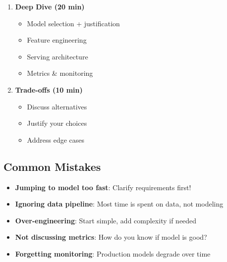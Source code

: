 \documentclass[8pt,landscape]{article}
\begin{document}
\begin{multicols}{3}
\begin{enumerate}
\item \textbf{Deep Dive (20 min)}
\begin{itemize}
\item Model selection + justification
\item Feature engineering
\item Serving architecture
\item Metrics \& monitoring
\end{itemize}

\item \textbf{Trade-offs (10 min)}
\begin{itemize}
\item Discuss alternatives
\item Justify your choices
\item Address edge cases
\end{itemize}
\end{enumerate}

\subsection*{Common Mistakes}

\begin{itemize}
\item \textbf{Jumping to model too fast}: Clarify requirements first!
\item \textbf{Ignoring data pipeline}: Most time is spent on data, not modeling
\item \textbf{Over-engineering}: Start simple, add complexity if needed
\item \textbf{Not discussing metrics}: How do you know if model is good?
\item \textbf{Forgetting monitoring}: Production models degrade over time
\end{itemize}

\end{multicols}
\end{document}
